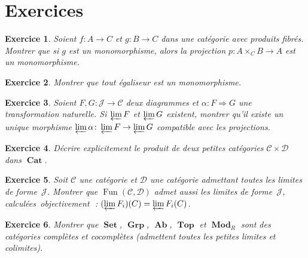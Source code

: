\documentclass[a4paper,12pt]{book}
\DeclareMathOperator{\Fun}{Fun}
\DeclareMathOperator{\Set}{\mathbf{Set}}
\DeclareMathOperator{\Grp}{\mathbf{Grp}}
\DeclareMathOperator{\Ab}{\mathbf{Ab}}
\DeclareMathOperator{\Top}{\mathbf{Top}}
\DeclareMathOperator{\Mod}{\mathbf{Mod}}
\DeclareMathOperator{\Cat}{\mathbf{Cat}}
\newtheorem{exercice}{Exercice}[chapter]
\providecommand{\og}{\guillemotleft\,}
\providecommand{\fg}{\,\guillemotright}
\begin{document}
\section{Exercices}\label{sec:exo-limites}

\begin{exercice}\label{exo:produit-fibre-mono}
Soient $f\colon A\to C$ et $g\colon B\to C$ dans une catégorie
avec produits fibrés. Montrer que si $g$ est un monomorphisme,
alors la projection $p\colon A\times_C B\to A$ est un monomorphisme.
\end{exercice}

\begin{exercice}\label{exo:egaliseur-mono}
Montrer que tout égaliseur est un monomorphisme.
\end{exercice}

\begin{exercice}\label{exo:limite-fonctorielle}
Soient $F,G\colon\mathcal{J}\to\mathcal{C}$ deux diagrammes et
$\alpha\colon F\Rightarrow G$ une transformation naturelle.
Si $\varprojlim F$ et $\varprojlim G$ existent, montrer qu'il
existe un unique morphisme
$\varprojlim\alpha\colon\varprojlim F\to\varprojlim G$
compatible avec les projections.
\end{exercice}

\begin{exercice}\label{exo:produit-dans-cat}
\index{produit!dans $\Cat$}
Décrire explicitement le produit de deux petites catégories
$\mathcal{C}\times\mathcal{D}$ dans $\Cat$.
\end{exercice}

\begin{exercice}\label{exo:limites-dans-foncteurs}
Soit $\mathcal{C}$ une catégorie et $\mathcal{D}$ une catégorie
admettant toutes les limites de forme~$\mathcal{J}$.
Montrer que $\Fun(\mathcal{C},\mathcal{D})$ admet aussi les limites
de forme~$\mathcal{J}$, calculées \og{}objectivement\fg{}~:
$(\varprojlim F_i)(C) = \varprojlim F_i(C)$.
\end{exercice}

\begin{exercice}\label{exo:complete-cocomplete}
Montrer que $\Set$, $\Grp$, $\Ab$, $\Top$ et $\Mod_R$
sont des catégories complètes et cocomplètes
(admettent toutes les petites limites et colimites).
\end{exercice}
\end{document}
